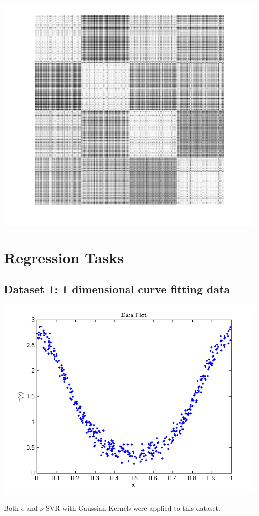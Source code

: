 \documentclass{article}
\begin{document}
\begin{center}
\includegraphics[scale=1]{Classification/1c/nu_g/kgm}
\end{center}






\section{Regression Tasks}

\subsection{Dataset 1: 1 dimensional curve fitting data}
\begin{center}
\includegraphics[scale=1]{Regression/univar}
\end{center}
Both $\epsilon$ and $\nu$-SVR with Gaussian Kernels were applied to this dataset.
\end{document}
